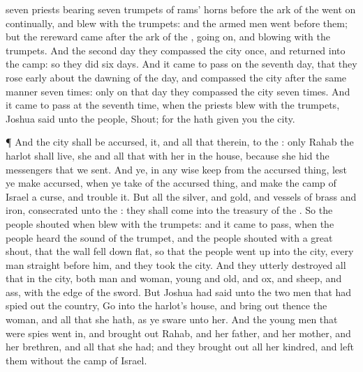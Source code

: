 {seven
priests
bearing
seven
trumpets of
rams’ horns
before the
ark of the
{} went
on
continually, and
blew with the
trumpets: and the armed
men
went
before them; but the
rereward
came
after the
ark of the
{},
{} going
on, and
blowing with the
trumpets.
And the
second
day they
compassed the
city
once, and
returned into the
camp: so they
did
six
days.
And it came to pass on the
seventh
day, that they rose
early about the
dawning of the
day, and
compassed the
city after the same
manner
seven
times: only on that
day they
compassed the
city
seven
times.
And it came to pass at the
seventh
time, when the
priests
blew with the
trumpets,
Joshua
said unto the
people,
Shout; for the
{} hath
given you the
city.
\par }{\PP {}¶ And the
city shall be
accursed,
{} it, and all that
{} therein, to the
{}: only
Rahab the
harlot shall
live, she and all that
{} with her in the
house, because she
hid the
messengers that we
sent.
And ye, in any
wise
keep
{} from the accursed
thing, lest ye make
{}
accursed, when ye
take of the accursed
thing, and
make the
camp of
Israel a
curse, and
trouble it.
But all the
silver, and
gold, and
vessels of
brass and
iron,
{}
consecrated unto the
{}: they shall
come into the
treasury of the
{}.
So the
people
shouted when
{}
blew with the
trumpets: and it came to pass, when the
people
heard the
sound of the
trumpet, and the
people
shouted with a
great
shout, that the
wall fell down
flat, so that the
people went
up into the
city, every
man straight before him, and they
took the
city.
And they utterly
destroyed all that
{} in the
city, both
man and
woman,
young and
old, and
ox, and
sheep, and
ass, with the
edge of the
sword.
But
Joshua had
said unto the
two
men that had spied
out the
country,
Go into the
harlot’s
house, and bring
out thence the
woman, and all that she hath, as ye
sware unto her.
And the young
men that were
spies went
in, and brought
out
Rahab, and her
father, and her
mother, and her
brethren, and all that she had; and they brought
out all her
kindred, and
left them
without the
camp of
Israel.
}
